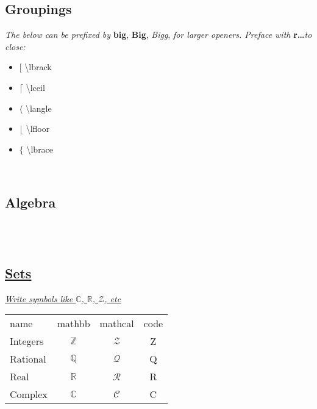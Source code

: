 \subsection*{Groupings} 
\textit{The below can be prefixed by }\textbf{big}, \textbf{Big}, \textit{Bigg},\textit{ for larger openers. Preface with }\textbf{r\dots}\textit{to close:}\\
\begin{minipage}{3cm}
\begin{itemize}[label={}]
    \item $\lbrack$ \textbackslash lbrack
    \item $\lceil$ \textbackslash lceil
    \item $\langle$ \textbackslash langle
\end{itemize} 
\end{minipage}
\begin{minipage}{3cm}
\begin{itemize}[label={}]
    \item $\lfloor$ \textbackslash lfloor
    \item $\lbrace$ \textbackslash lbrace
\end{itemize} 
\end{minipage}\ \\




\subsection*{Algebra}


\\
\\



\subsection*{\href{http://mirrors.ctan.org/macros/latex/required/amsmath/amsldoc.pdf}{Sets}}
\textit{\href{http://mirrors.ctan.org/macros/latex/required/amsmath/amsldoc.pdf}{Write symbols like $\mathbb{C}$, $\mathbb{R}$, $\mathcal{Z}$, etc }}\\
\begin{tabular}{l c c c}
    name & mathbb & mathcal & code \\
    Integers & $\mathbb{Z}$ & $\mathcal{Z}$ & Z \\
    Rational & $\mathbb{Q}$ & $\mathcal{Q}$ & Q \\
    Real & $\mathbb{R}$ & $\mathcal{R}$ & R \\
    Complex & $\mathbb{C}$ & $\mathcal{C}$ & C \\
\end{tabular}\ \\

